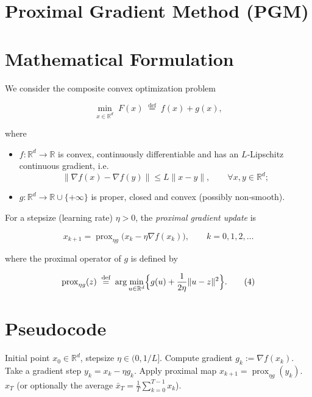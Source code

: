 \documentclass{article}
\newcommand{\prox}{\operatorname{prox}}
\newcommand{\R}{\mathbb{R}}
\begin{document}
\section*{Proximal Gradient Method (PGM)}

\section*{Mathematical Formulation}
We consider the composite convex optimization problem  

\[
\min_{x\in \R^{d}} \; F(x)\;\stackrel{\text{def}}{=}\;f(x)+g(x),
\tag{1}
\]

where  

\begin{itemize}
\item $f:\R^{d}\to\R$ is convex, continuously differentiable and has an $L$‑Lipschitz continuous gradient, i.e.  
\[
\|\nabla f(x)-\nabla f(y)\|\le L\|x-y\|,\qquad \forall x,y\in\R^{d};
\tag{2}
\]
\item $g:\R^{d}\to\R\cup\{+\infty\}$ is proper, closed and convex (possibly non‑smooth).  
\end{itemize}

For a stepsize (learning rate) $\eta>0$, the \emph{proximal gradient update} is  

\[
x_{k+1}= \prox_{\eta g}\!\bigl(x_{k}-\eta \nabla f(x_{k})\bigr),
\qquad k=0,1,2,\dots
\tag{3}
\]

where the proximal operator of $g$ is defined by  

\[
\prox_{\eta g}(z) \;\stackrel{\text{def}}{=}\; \arg\min_{u\in\R^{d}}
\Bigl\{ g(u)+\frac{1}{2\eta}\|u-z\|^{2}\Bigr\}.
\tag{4}
\]

\section*{Pseudocode}
\begin{algorithm}[H]
\caption{Proximal Gradient Method}
\begin{algorithmic}[1]
\REQUIRE Initial point $x_{0}\in\R^{d}$, stepsize $\eta\in(0,1/L]$.
    \STATE Compute gradient $g_{k}:=\nabla f(x_{k})$.
    \STATE Take a gradient step $y_{k}=x_{k}-\eta g_{k}$.
    \STATE Apply proximal map $x_{k+1}= \prox_{\eta g}(y_{k})$.
\ENDFOR
\RETURN $x_{T}$ (or optionally the average $\bar x_T=\frac1T\sum_{k=0}^{T-1}x_k$).
\end{algorithmic}
\end{algorithm}
\end{document}
